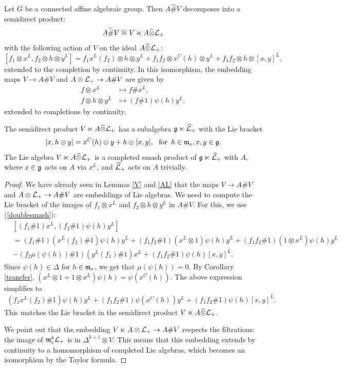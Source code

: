 \documentclass[12pt]{amsart}
\begin{document}
\begin{theorem} 
\label{decomposition}
Let $G$ be a connected affine algebraic group. Then $A \widehat\# V$ decomposes into a semidirect product:
$$A \widehat\# V \cong V \ltimes A \widehat\otimes {\mathcal L}_+$$
with the following action of $V$ on the ideal $A \widehat\otimes {\mathcal L}_+$:
$$[f_1 \otimes x^L, f_2 \otimes h \otimes y^L ] = f_1 x^L(f_2)   \otimes h \otimes y^L 
+ f_1 f_2 \otimes x^C(h) \otimes y^L + f_1 f_2 \otimes h \otimes [x,y]^L,$$
extended to the completion by continuity.
In this isomorphism, the embedding maps $V \rightarrow A \# V$ and $A \otimes {\mathcal L}_+ \rightarrow  A \# V$ are given by
\begin{align*}
f \otimes x^L &\mapsto f \# x^L, \\
f \otimes h \otimes y^L &\mapsto (f \# 1) \psi(h)  y^L,
\end{align*}
extended to completions by continuity.
\end{theorem}
\begin{remark}
The semidirect product $V \ltimes A \widehat\otimes {\mathcal L}_+$ has a subalgebra $\mathfrak{g} \ltimes \widehat{\mathcal L}_+$ with the Lie bracket
$$[x, h \otimes y] = x^C (h) \otimes y + h \otimes [x, y], \ \ \text{for \,} h \in \mathfrak{m}_e, x,y\in\mathfrak{g}.$$
The Lie algebra $V \ltimes A \widehat\otimes {\mathcal L}_+$ is a completed smash product of $\mathfrak{g} \ltimes \widehat{\mathcal L}_+$ with $A$, where $x \in \mathfrak{g}$ acts on $A$ via $x^L$, and $\widehat{\mathcal L}_+$ acts on $A$ trivially.
\end{remark}
\begin{proof}
We have already seen in Lemmas \ref{V} and \ref{AL}
that the maps $V \rightarrow A \# V$ and $A \otimes {\mathcal L}_+ \rightarrow  A \# V$ are embeddings
of Lie algebras.
We need to compute the Lie bracket of the images of $f_1 \otimes x^L$ and $f_2 \otimes h \otimes y^L$ in $A \# V$. For this, we use (\ref{doublesmash}):
\begin{align*}
&[(f_1 \# 1) x^L, (f_2 \# 1) \psi(h) y^L]  \\
&= (f_1 \# 1) (x^L (f_2) \# 1) \psi(h) y^L 
+  (f_1 f_2 \# 1)(x^L \otimes 1) \psi(h) y^L 
+  (f_1 f_2 \# 1)(1 \otimes x^L) \psi(h) y^L\\
&- (f_2 \mu(\psi(h)) \# 1) (y^L (f_1) \# 1) x^L
+ (f_1 f_2 \# 1)  \psi(h) [x,y]^L.
\end{align*}
Since $\psi(h) \in \Delta$ for $h\in\mathfrak{m}_e$, we get that $\mu(\psi(h)) = 0$. By Corollary \ref{transfer}, 
$(x^L \otimes 1 + 1\otimes x^L) \psi(h) = \psi(x^C (h))$. The above expression simplifies to
\begin{align*}
(f_1 x^L (f_2) \# 1) \psi(h) y^L 
+  (f_1 f_2 \# 1) \psi(x^C(h)) y^L 
+ (f_1 f_2 \# 1)  \psi(h) [x,y]^L.
\end{align*}
This matches the Lie bracket in the semidirect product $V \ltimes A \widehat\otimes {\mathcal L}_+$.

We point out that the embedding $V \ltimes A \otimes {\mathcal L}_+ \rightarrow A \# V$ respects the filtrations: the image of $\mathfrak{m}_e^k {\mathcal L}_+$ is in $\Delta^{k+1} \otimes V$. This means that this embedding extends by continuity to a homomorphism of completed Lie algebras, which becomes an isomorphism by the Taylor formula.
\end{proof}
\end{document}
